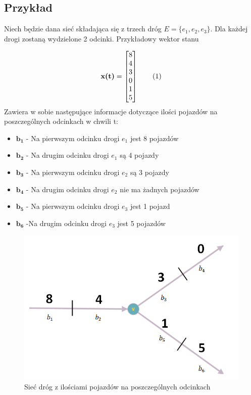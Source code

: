 \documentclass[12pt]{book}
\theoremstyle{plain}
\newcommand\addtag{\refstepcounter{equation}
\renewcommand{\labelenumii}{\theenumii}
\renewcommand{\theenumii}{\theenumi.\arabic{enumii}.}
\tag{\theequation}}
\begin{document}
\subsection{Przykład} \label{subsec:wektor_stanu_siec_przyklad}
Niech będzie dana sieć składająca się z trzech dróg $E=\{e_1,e_2,e_3\}$. Dla każdej drogi zostaną wydzielone 2 odcinki. Przykładowy wektor stanu
\def \xzero {\begin{bmatrix}
		8 \\ 4 \\ 3 \\ 0 \\ 1 \\ 5
\end{bmatrix}}

\[\textbf{x(t)}=\xzero \addtag \]
Zawiera w sobie następujące informacje dotyczące ilości pojazdów na poszczególnych odcinkach w chwili t:
\begin{itemize}
	\item $\boldsymbol{b_1}$ - Na pierwszym odcinku drogi $e_1$ jest 8 pojazdów
	\item $\boldsymbol{b_2}$ - Na drugim odcinku drogi $e_1$ są 4 pojazdy 
	\item $\boldsymbol{b_3}$ - Na pierwszym odcinku drogi $e_2$ są 3 pojazdy 
	\item $\boldsymbol{b_4}$ - Na drugim odcinku drogi $e_2$ nie ma żadnych pojazdów 
	\item $\boldsymbol{b_5}$ - Na pierwszym odcinku drogi $e_3$ jest 1 pojazd
	\item $\boldsymbol{b_6}$ -Na drugim odcinku drogi $e_3$ jest 5 pojazdów
\end{itemize}

\begin{figure}[H]
	\centering
	\includegraphics[width=14cm]{3_single_road}
	\caption{Sieć dróg z ilościami pojazdów na poszczególnych odcinkach}
	\label{fig:3_single_road}
\end{figure}
\end{document}
